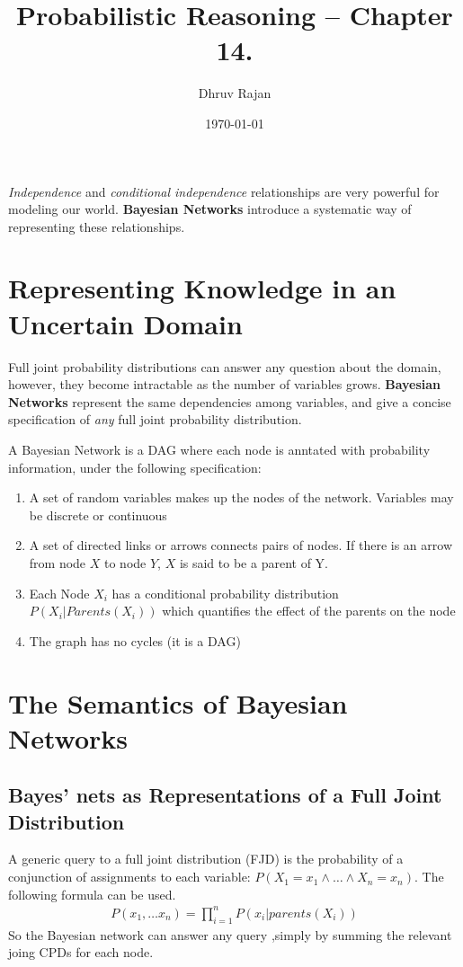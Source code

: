 \documentclass[12pt]{article}
\begin{document}
\title{Probabilistic Reasoning -- Chapter 14.}
\author{Dhruv Rajan}
\date{\today}
\maketitle

\textit{Independence} and \textit{conditional independence} relationships are very
powerful for modeling our world. \textbf{Bayesian Networks} introduce a
systematic way of representing these relationships.

\section{Representing Knowledge in an Uncertain Domain}
Full joint probability distributions can answer any question about the
domain, however, they become intractable as the number of variables
grows. \textbf{Bayesian Networks} represent the same dependencies among variables,
and give a concise specification of \textit{any} full joint probability distribution.

A Bayesian Network is a DAG where each node is anntated with probability information,
under the following specification:
\begin{enumerate}
\item A set of random variables makes up the nodes of the
  network. Variables may be discrete or continuous
\item A set of directed links or arrows connects pairs of nodes. If
  there is an arrow from node $X$ to node $Y$, $X$ is said to be a
  parent of Y.
\item Each Node $X_i$ has a conditional probability distribution
  $P(X_i | Parents(X_i))$ which quantifies the effect of the parents
  on the node
\item The graph has no cycles (it is a DAG)
\end{enumerate}

\section{The Semantics of Bayesian Networks}
\subsection{Bayes' nets as Representations of a Full Joint Distribution}
A generic query to a full joint distribution (FJD) is the probability
of a conjunction of assignments to each variable:
$P(X_1 = x_1 \land \dots \land X_n = x_n)$. The following formula can be used.
\begin{align*}
  P(x_1, \dots x_n) = \prod_{i = 1}^{n} P(x_i | parents(X_i))
\end{align*}
So the Bayesian network can answer any query ,simply by summing the
relevant joing CPDs for each node.
\end{document}
